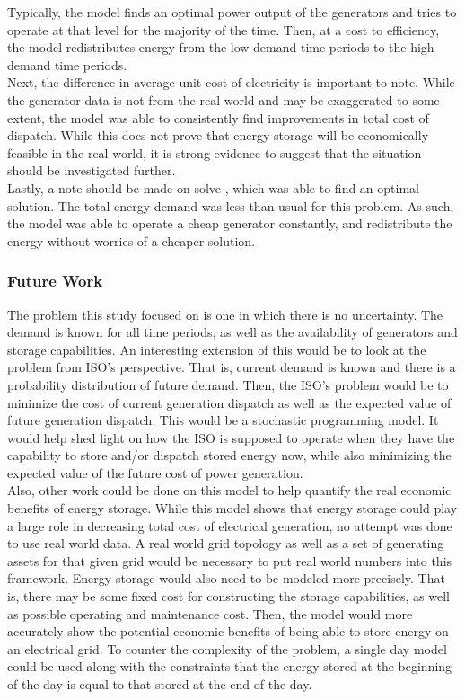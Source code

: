 Typically, the model finds an optimal power output of the generators and tries to operate at that level
for the majority of the time. Then, at a cost to efficiency, the model redistributes energy from the low
demand time periods to the high demand time periods. \\

Next, the difference in average unit cost of electricity is important to note. While the generator
data is not from the real world and may be exaggerated to some extent, the model was able to
consistently find improvements in total cost of dispatch. While this does not prove that energy storage
will be economically feasible in the real world, it is strong evidence to suggest that the situation should
be investigated further.  \\

Lastly, a note should be made on solve , which was able to find an optimal solution. The total
energy demand was less than usual for this problem. As such, the model was able to operate a cheap
generator constantly, and redistribute the energy without worries of a cheaper solution.

\subsubsection{Future Work}
The problem this study focused on is one in which there is no uncertainty. The demand is
known for all time periods, as well as the availability of generators and storage capabilities. An
interesting extension of this would be to look at the problem from ISO’s perspective. That is, current
demand is known and there is a probability distribution of future demand. Then, the ISO’s problem
would be to minimize the cost of current generation dispatch as well as the expected value of future
generation dispatch. This would be a stochastic programming model. It would help shed light on how
the ISO is supposed to operate when they have the capability to store and/or dispatch stored energy
now, while also minimizing the expected value of the future cost of power generation.	\\

Also, other work could be done on this model to help quantify the real economic benefits of
energy storage. While this model shows that energy storage could play a large role in decreasing total
cost of electrical generation, no attempt was done to use real world data. A real world grid topology as
well as a set of generating assets for that given grid would be necessary to put real world numbers into
this framework. Energy storage would also need to be modeled more precisely. That is, there may be
some fixed cost for constructing the storage capabilities, as well as possible operating and maintenance
cost. Then, the model would more accurately show the potential economic benefits of being able to
store energy on an electrical grid. To counter the complexity of the problem, a single day model could
be used along with the constraints that the energy stored at the beginning of the day is equal to that
stored at the end of the day.

